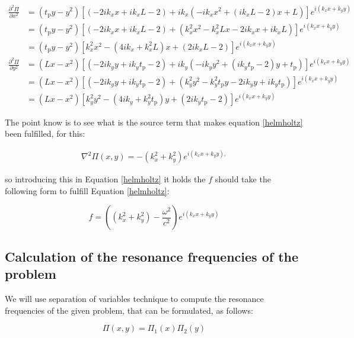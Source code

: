 \documentclass{article}[a4paper, 12pt]
\begin{document}
\begin{equation*}
    \begin{aligned}
        \frac{\partial^2\Pi}{\partial x^2} &= \left(t_{\mathrm{p}}y-y^2\right)\left[\left(-2ik_x x + ik_xL-2 \right)+ik_x\left( -ik_x x^2 + \left( ik_xL-2 \right)x + L\right) \right]e^{i\left( k_xx + k_yy \right)} \\[1.5ex]
        &= \left(t_{\mathrm{p}}y-y^2\right)\left[\left(-2ik_x x + ik_xL-2 \right)+\left( k_x^2 x^2 -k_x^2Lx - 2ik_xx + ik_xL\right) \right]e^{i\left( k_xx + k_yy \right)}\\[1.5ex]
        &= \left(t_{\mathrm{p}}y-y^2\right)\left[ k_x^2 x^2 - \left(4ik_x + k_x^2L \right)x + \left( 2ik_xL-2 \right)   \right]e^{i\left( k_xx + k_yy \right)}\\[2ex]   
        \frac{\partial^2\Pi}{\partial y^2} &= \left(Lx-x^2\right)\left[\left(-2ik_y y + ik_yt_{\mathrm{p}}-2 \right)+ik_y\left( -ik_y y^2 + \left( ik_yt_{\mathrm{p}}-2 \right)y + t_{\mathrm{p}}\right) \right]e^{i\left( k_xx + k_yy \right)} \\[1.5ex]
        &= \left(Lx-x^2\right)\left[\left(-2ik_y y + ik_yt_{\mathrm{p}}-2 \right)+\left( k_y^2 y^2 -k_y^2t_{\mathrm{p}}y - 2ik_yy + ik_yt_{\mathrm{p}}\right) \right]e^{i\left( k_xx + k_yy \right)}\\[1.5ex]
        &= \left(Lx-x^2\right)\left[ k_y^2 y^2 - \left(4ik_y + k_y^2t_{\mathrm{p}} \right)y + \left( 2ik_yt_{\mathrm{p}}-2 \right)   \right]e^{i\left( k_xx + k_yy \right)} 
    \end{aligned}
\end{equation*}

The point know is to see what is the source term that makes equation \eqref{helmholtz} been fulfilled, for this:

\begin{equation}\label{eqlap}
    \begin{aligned}
        \nabla^2\Pi(x,y) = -(k_x^2 + k_y^2)\displaystyle e^{i\left( k_xx + k_yy \right),}
    \end{aligned}
\end{equation}

so introducing this in Equation \eqref{helmholtz} it holds the $f$ should take the following form to fulfill Equation \eqref{helmholtz}:

\begin{equation}
    f = \left( \left( k_x^2 + k_y^2 \right) - \displaystyle \frac{\omega^2}{c^2} \right) \displaystyle e^{i\left( k_xx + k_yy \right)}
\end{equation}

\subsection*{Calculation of the resonance frequencies of the problem}

We will use separation of variables technique to compute the resonance frequencies of the given problem, that can be formulated, as follows:

$$ \Pi(x,y) = \Pi_1(x)\Pi_2(y) $$
\end{document}
